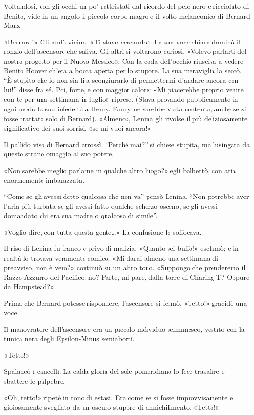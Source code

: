 \documentclass[
a5paper, %
10pt, %
twoside, 
onecolumn, %
openany, %
]{memoir}
\begin{document}
Voltandosi, con gli occhi un po’ rattristati dal ricordo del pelo nero e riccioluto di Benito, vide in un angolo il piccolo corpo magro e il volto melanconico di Bernard Marx.

«Bernard!» Gli andò vicino. «Ti stavo cercando». La sua voce chiara dominò il ronzio dell’ascensore che saliva. Gli altri si voltarono curiosi. «Volevo parlarti del nostro progetto per il Nuovo Messico». Con la coda dell’occhio riusciva a vedere Benito Hoover ch’era a bocca aperta per lo stupore. La sua meraviglia la seccò. “È stupito che io non sia li a scongiurarlo di permettermi d’andare ancora con lui!” disse fra sé. Poi, forte, e con maggior calore: «Mi piacerebbe proprio venire con te per una settimana in luglio» riprese. (Stava provando pubblicamente in ogni modo la sua infedeltà a Henry. Fanny ne sarebbe stata contenta, anche se si fosse trattato solo di Bernard). «Almeno», Lenina gli rivolse il più deliziosamente significativo dei suoi sorrisi. «se mi vuoi ancora!»

Il pallido viso di Bernard arrossì. “Perché mai?” si chiese stupita, ma lusingata da questo strano omaggio al suo potere.

«Non sarebbe meglio parlarne in qualche altro luogo?» egli balbettò, con aria enormemente imbarazzata.

“Come se gli avessi detto qualcosa che non va” pensò Lenina. “Non potrebbe aver l’aria più turbata se gli avessi fatto qualche scherzo osceno, se gli avessi domandato chi era sua madre o qualcosa di simile”.

«Voglio dire, con tutta questa gente…» La confusione lo soffocava.

Il riso di Lenina fu franco e privo di malizia. «Quanto sei buffo!» esclamò; e in realtà lo trovava veramente comico. «Mi darai almeno una settimana di preavviso, non è vero?» continuò su un altro tono. «Suppongo che prenderemo il Razzo Azzurro del Pacifico, no? Parte, mi pare, dalla torre di Charing-T? Oppure da Hampstead?»

Prima che Bernard potesse rispondere, l’ascensore si fermò. «Tetto!» gracidò una voce.

Il manovratore dell’ascensore era un piccolo individuo scimmiesco, vestito con la tunica nera degli Epsilon-Minus semiaborti.

«Tetto!»

Spalancò i cancelli. La calda gloria del sole pomeridiano lo fece trasalire e sbattere le palpebre.

«Oh, tetto!» ripeté in tono di estasi. Era come se si fosse improvvisamente e gioiosamente svegliato da un oscuro stupore di annichilimento. «Tetto!»
\end{document}
